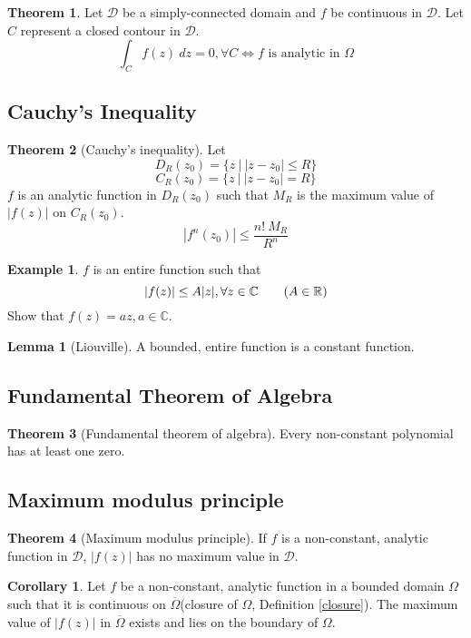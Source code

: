 \documentclass[10pt, a4paper]{extarticle}
\theoremstyle{definition}
\newtheorem{thm}{Theorem}
\newtheorem{lem}{Lemma}[thm]
\newtheorem{cor}{Corollary}[thm]
\newtheorem{eg}{Example}
\begin{document}
\begin{thm}
	Let $\mathscr{D}$ be a simply-connected domain and $f$ be continuous in $\mathscr{D}$. Let $C$ represent a closed contour in $\mathscr{D}$.
	\[\int_Cf(z)\ dz=0,\forall C\iff f \text{ is analytic in }\Omega\]
\end{thm}

\subsection{Cauchy's Inequality}
\begin{thm}[Cauchy's inequality]
	Let
	\[D_R(z_0)=\{z\ |\ |z-z_0|\leq R\}\]
	\[C_R(z_0)=\{z\ |\ |z-z_0|=R\}\]
	$f$ is an analytic function in $D_R(z_0)$ such that $M_R$ is the maximum value of $|f(z)|$ on $C_R(z_0)$.
	\[\left|f^n(z_0)\right|\leq \frac{n!\ M_R}{R^n}\tag*{($n=1,2,\cdots$)}\]
\end{thm}
\begin{eg}
	$f$ is an entire function such that
	\[|f(z)|\leq A|z|,\forall z\in\mathbb{C}\tag*{($A\in\mathbb{R}$)}\]
	Show that $f(z)=az,a\in\mathbb{C}$.
\end{eg}
\begin{lem}[Liouville]
	A bounded, entire function is a constant function.
\end{lem}

\subsection{Fundamental Theorem of Algebra}
\begin{thm}[Fundamental theorem of algebra]
	Every non-constant polynomial has at least one zero.
\end{thm}

\subsection{Maximum modulus principle}


\begin{thm}[Maximum modulus principle]
	If $f$ is a non-constant, analytic function in $\mathscr{D}$, $|f(z)|$ has no maximum value in $\mathscr{D}$.
\end{thm}
\begin{cor}
	Let $f$ be a non-constant, analytic function in a bounded domain $\Omega$ such that it is continuous on $\overline{\Omega}$(closure of $\Omega$, Definition \ref{closure}). The maximum value of $|f(z)|$ in $\overline{\Omega}$ exists and lies on the boundary of $\Omega$.
\end{cor}
\end{document}
